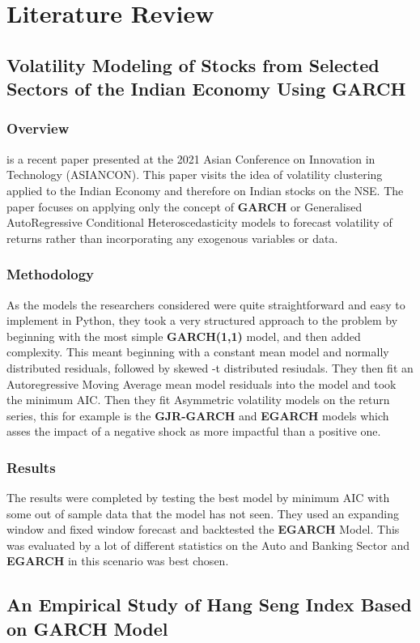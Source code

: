 \chapter{Literature Review}


\section{Volatility Modeling of Stocks from Selected Sectors of the Indian Economy Using GARCH}
\subsection{Overview}
\cite{9544977} is a recent paper presented at the 2021 Asian Conference on Innovation in Technology (ASIANCON). This paper visits the idea of volatility clustering applied to the Indian Economy and therefore on Indian stocks on the NSE. The paper focuses on applying only the concept of \textbf{GARCH} or Generalised AutoRegressive Conditional Heteroscedasticity models to forecast volatility of returns rather than incorporating any exogenous variables or data.
\subsection{Methodology}
As the models the researchers considered were quite straightforward and easy to implement in Python, they took a very structured approach to the problem by beginning with the most simple \textbf{GARCH(1,1)} model, and then added complexity. This meant beginning with a constant mean model and normally distributed residuals, followed by skewed -t distributed resiudals. They then fit an Autoregressive Moving Average mean model residuals into the model and took the minimum AIC. Then they fit Asymmetric volatility models on the return series, this for example is the \textbf{GJR-GARCH} and \textbf{EGARCH} models which asses the impact of a negative shock as more impactful than a positive one. 
\subsection{Results}
The results were completed by testing the best model by minimum AIC with some out of sample data that the model has not seen. They used an expanding window and fixed window forecast and backtested the \textbf{EGARCH} Model. This was evaluated by a lot of different statistics on the Auto and Banking Sector and \textbf{EGARCH} in this scenario was best chosen.
\section{An Empirical Study of Hang Seng Index Based on GARCH Model}
